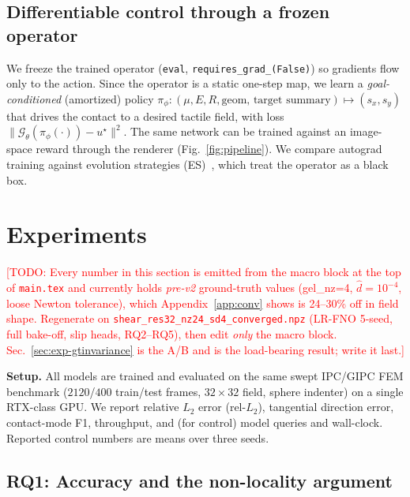 \documentclass[conference]{IEEEtran}
\newcommand{\relL}{\mathrm{rel}\text{-}L_2}
\newcommand{\todo}[1]{\textcolor{red}{[TODO: #1]}}
\begin{document}
\subsection{Differentiable control through a frozen operator}\label{sec:method-control}
We freeze the trained operator (\texttt{eval}, \texttt{requires\_grad\_(False)}) so
gradients flow only to the action. Since the operator is a static one-step map, we
learn a \emph{goal-conditioned} (amortized) policy
$\pi_\phi:(\mu,E,R,\text{geom},\,\text{target summary})\mapsto(s_x,s_y)$ that drives
the contact to a desired tactile field, with loss
$\lVert\mathcal{G}_\theta(\pi_\phi(\cdot))-u^\star\rVert^2$. The same network can be
trained against an image-space reward through the renderer (Fig.~\ref{fig:pipeline}).
We compare autograd training against evolution strategies (ES)~\cite{salimans2017es},
which treat the operator as a black box.

\section{Experiments}\label{sec:exp}

\todo{Every number in this section is emitted from the macro block at the top of
\texttt{main.tex} and currently holds \emph{pre-v2} ground-truth values (gel\_nz=4,
$\hat d=10^{-4}$, loose Newton tolerance), which Appendix~\ref{app:conv} shows is
24--30\% off in field shape. Regenerate on \texttt{shear\_res32\_nz24\_sd4\_converged.npz}
(LR-FNO 5-seed, full bake-off, slip heads, RQ2--RQ5), then edit \emph{only} the macro
block. Sec.~\ref{sec:exp-gtinvariance} is the A/B and is the load-bearing result;
write it last.}

\textbf{Setup.} All models are trained and evaluated on the same swept IPC/GIPC
FEM benchmark ($2120$/$400$ train/test frames, $32\times32$ field, sphere indenter)
on a single RTX-class GPU. We report relative $L_2$ error ($\relL$), tangential
direction error, contact-mode F1, throughput, and (for control) model queries and
wall-clock. Reported control numbers are means over three seeds.

\subsection{RQ1: Accuracy and the non-locality argument}\label{sec:exp-accuracy}
\end{document}
